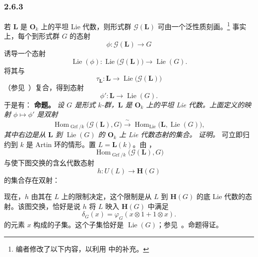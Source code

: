 
\subsubsection*{2.6.3}
\label{sga3:VIIB:2.6.3}
若 \(\mathbf L\) 是 \(\mathbf O_k\) 上的平坦 Lie 代数，则形式群 \(\mathscr G(\mathbf L)\) 可由一个泛性质刻画。\footnote{%
\label{sga3:VIIB:nde:111}编者修改了以下内容，以利用  中的补充。}
事实上，每个到形式群 \(G\) 的态射
\[
  \phi:\mathscr G(\mathbf L)\longrightarrow G
\]
诱导一个态射
\[
  \operatorname{Lie}(\phi):
  \operatorname{Lie}\bigl(\mathscr G(\mathbf L)\bigr)
  \longrightarrow
  \operatorname{Lie}(G).
\]
将其与
\[
  \tau_{\mathbf L}:
  \mathbf L\longrightarrow
  \operatorname{Lie}\bigl(\mathscr G(\mathbf L)\bigr)
\]
\textup{（参见\ ）}复合，得到态射
\[
  \phi':\mathbf L\longrightarrow\operatorname{Lie}(G).
\]
于是有：
\medskip
\noindent\textbf{命题。}
\label{sga3:VIIB:2.6.3:prop}
{\itshape 设 \(G\) 是形式 \(k\)-群，\(\mathbf L\) 是 \(\mathbf O_k\) 上的平坦 Lie 代数。上面定义的映射 \(\phi\mapsto\phi'\) 是双射
\[
  \operatorname{Hom}_{\operatorname{Grf}/k}
    \bigl(\mathscr G(\mathbf L),G\bigr)
  \xrightarrow{\ \sim\ }
  \operatorname{Hom}_{\operatorname{Lie}}
    \bigl(\mathbf L,\operatorname{Lie}(G)\bigr),
\]
其中右边是从 \(\mathbf L\) 到 \(\operatorname{Lie}(G)\) 的 \(\mathbf O_k\) 上 Lie 代数态射的集合。}
\textit{证明。}
可立即归约到 \(k\) 是 Artin 环的情形。置 \(L=\mathbf L(k)\)。由 ，
\[
  \operatorname{Hom}_{\operatorname{Grf}/k}
    \bigl(\mathscr G(\mathbf L),G\bigr)
\]
与使下图交换的含幺代数态射
\[
  h:U(L)\longrightarrow\mathbf H(G)
\]
的集合存在双射：
\begin{center}
  \label{sga3:VIIB:2.6.3:universal-property-diagram}
  
\end{center}
现在，\(h\) 由其在 \(L\) 上的限制决定，这个限制是从 \(L\) 到 \(\mathbf H(G)\) 的底 Lie 代数的态射。该图交换，恰好是说 \(h\) 将 \(L\) 映入 \(\mathbf H(G)\) 中满足
\[
  \delta_G(x)
  =
  \varphi_G(x\otimes1+1\otimes x).
\]
的元素 \(x\) 构成的子集。这个子集恰好是 \(\operatorname{Lie}(G)\)；参见\ 。命题得证。
